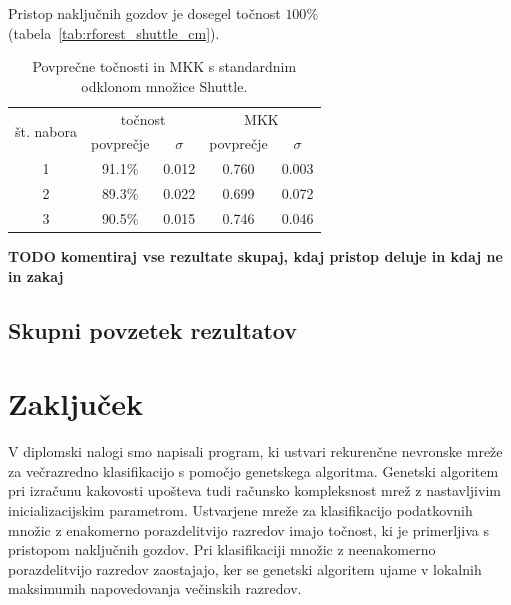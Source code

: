 \documentclass[a4paper,12pt,openright]{book}
\begin{document}
    Pristop naključnih gozdov je dosegel točnost $100\%$ (tabela~\ref{tab:rforest_shuttle_cm}).

    \begin{table}[H]
        \begin{center}
            \begin{tabular}{|| c | c c || c c ||}
                \hline
                \multirow{2}{*}{št. nabora} & \multicolumn{2}{c||}{točnost} & \multicolumn{2}{c||}{MKK} \\ \cline{2-5}
                & povprečje & $\sigma$ & povprečje & $\sigma$ \\
                \hline
                1 & 91.1\%    & 0.012    & 0.760     & 0.003    \\
                2 & 89.3\%    & 0.022    & 0.699     & 0.072    \\
                3 & 90.5\%    & 0.015    & 0.746     & 0.046    \\
                \hline
            \end{tabular}
        \end{center}
        \caption{Povprečne točnosti in MKK s standardnim odklonom množice Shuttle.}
        \label{tab:random-forest-shuttle-test}
    \end{table}

    \textbf{TODO komentiraj vse rezultate skupaj, kdaj pristop deluje in kdaj ne in zakaj}

    \section{Skupni povzetek rezultatov}



    \chapter{Zaključek}\label{ch:zakljucki-sklep}
    V diplomski nalogi smo napisali program, ki ustvari rekurenčne nevronske mreže za večrazredno klasifikacijo s pomočjo genetskega algoritma.
    Genetski algoritem pri izračunu kakovosti upošteva tudi računsko kompleksnost mrež z nastavljivim inicializacijskim parametrom.
    Ustvarjene mreže za klasifikacijo podatkovnih množic z enakomerno porazdelitvijo razredov imajo točnost, ki je primerljiva s
    pristopom naključnih gozdov.
    Pri klasifikaciji množic z neenakomerno porazdelitvijo razredov zaostajajo, ker se genetski
    algoritem ujame v lokalnih maksimumih napovedovanja večinskih razredov.
\end{document}
